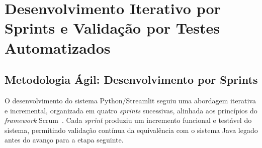 \chapter{Desenvolvimento Iterativo por Sprints e Validação por Testes Automatizados}

\section{Metodologia Ágil: Desenvolvimento por Sprints}

O desenvolvimento do sistema Python/Streamlit seguiu uma abordagem iterativa e
incremental, organizada em quatro \textit{sprints} sucessivas, alinhada aos
princípios do \textit{framework} Scrum~\cite{scrum2026}. Cada \textit{sprint}
produziu um incremento funcional e testável do sistema, permitindo validação
contínua da equivalência com o sistema Java legado antes do avanço para a
etapa seguinte.

